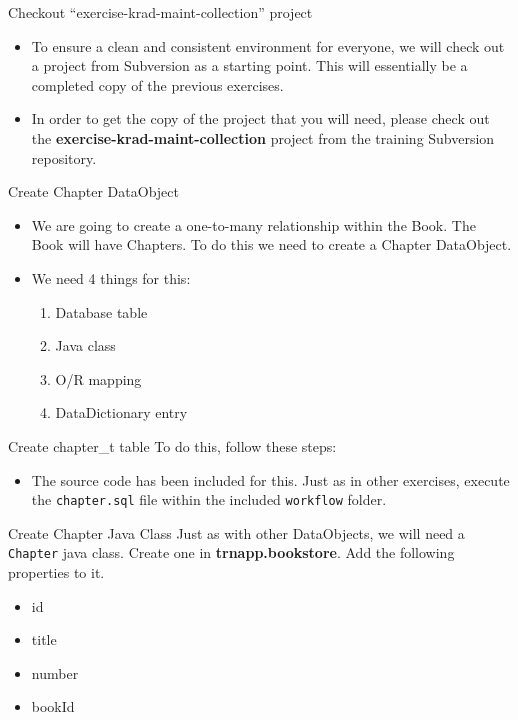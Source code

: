 \documentclass[xcolor=dvipsnames,14pt,professionalfonts]{beamer}
\begin{document}
\begin{frame}{Checkout “exercise-krad-maint-collection” project}
  \begin{itemize}
    \item To ensure a clean and consistent environment for everyone, we will check out a project from Subversion as a starting point.  This will essentially be a completed copy of the previous exercises.
    \item In order to get the copy of the project that you will need,
      please check out the \textbf{exercise-krad-maint-collection} project from
      the training Subversion repository.
      \end{itemize}
    \end{frame}
    
    \begin{frame}{Create Chapter DataObject}
      \begin{itemize}
      \item We are going to create a one-to-many relationship within
        the Book. The Book will have Chapters. To do this we need to
        create a Chapter DataObject.
      \item We need 4 things for this:
        \begin{enumerate}
          \item Database table
          \item Java class
          \item O/R mapping
          \item DataDictionary entry
          \end{enumerate}
      \end{itemize}     
    \end{frame}

    \begin{frame}{Create chapter_t table}
 To do this, follow these steps:
      \begin{itemize}
      \item The source code has been included for this. Just as in
        other exercises, execute the \texttt{chapter.sql} file within
        the included \texttt{workflow} folder.
      \end{itemize}     
    \end{frame}
 
 \begin{frame}{Create Chapter Java Class}
   Just as with other DataObjects, we will need a \texttt{Chapter}
   java class. Create one in \textbf{trnapp.bookstore}. Add the
   following properties to it.
   \begin{itemize}
     \item id
     \item title
     \item number
     \item bookId
   \end{itemize}
 \end{frame}
\end{document}
